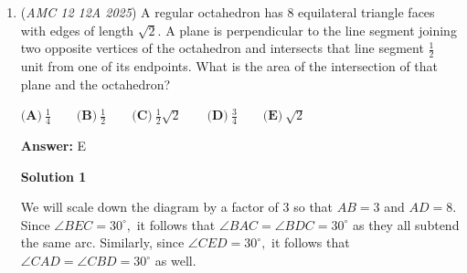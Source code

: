 \begin{enumerate}
 -Cyrus825 ~ScoutViolet (mostly minor fixes) ~knight10 (minor fixes)

 



\textbf{Solution 2}

We first try to simplify both log equations, and then we bring in the equation for velocity.

 For the equation representing organisms with 5 toes:

 $\log v = 4 + 2 \log m$
$\log v = \log 10^4 + \log m^2$
$\log v = \log(10^4\cdot m^2)$
$v = 10^4\cdot m^2$
$k\cdot 5^am^b = 10^4\cdot m^2$ 

 We do the same with the logarithm equation representing organisms with 25 eyes to get:

 $\log v = 4 + 4 \log n$
$v = 10^4\cdot n^4$
$k\cdot n^a(25^b) = 10^4\cdot n^4$

 Now we need to figure out what $a$, $b$, and $k$ are. Looking at the first equation (or the second), we notice that we can easily match factors. There are two $m$s on the right side so we set $b = 2$ so there are two $m$s on the left side. Now we need $10^4 = k\cdot 5^a = 5^4\cdot 2^4$. There are four $5$s on one side, so we need $a = 4$ to get four $5$s on the other. Now, $k = 2^4 = 16$. This solution works for the first equation.

 Checking if these values work with the second equation, it does, so our answer is $2 + 4 + 16 = \boxed{22}$



	\item (\textit{AMC 12 12A 2025}) A regular octahedron has $8$ equilateral triangle faces with edges of length $\sqrt{2}$. A plane is perpendicular to the line segment joining two opposite vertices of the octahedron and intersects that line segment $\frac{1}{2}$ unit from one of its endpoints. What is the area of the intersection of that plane and the octahedron?


 $\textbf{(A)}\   \frac{1}{4}  \qquad                 \textbf{(B)}\   \frac{1}{2}  \qquad                 \textbf{(C)}\   \frac{1}{2}\sqrt{2}  \qquad                 \textbf{(D)}\   \frac{3}{4}  \qquad                 \textbf{(E)}\   \sqrt{2}$

 \textbf{Answer: }E



\textbf{Solution 1}

We will scale down the diagram by a factor of $3$ so that $AB = 3$ and $AD = 8.$ Since $\angle BEC = 30^{\circ},$ it follows that $\angle BAC = \angle BDC = 30^{\circ}$ as they all subtend the same arc. Similarly, since $\angle CED = 30^{\circ},$ it follows that $\angle CAD = \angle CBD = 30^{\circ}$ as well.


\end{enumerate}
